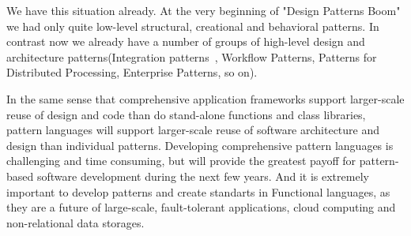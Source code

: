 We have this situation already. At the very beginning of "Design Patterns Boom" we had only quite low-level structural, creational and behavioral patterns. In contrast now we already have a number of groups of high-level design and architecture patterns(Integration patterns~\cite{res22}, Workflow Patterns, Patterns for Distributed Processing, Enterprise Patterns, so on). 

In the same sense that comprehensive application frameworks support larger-scale reuse of design and code than do stand-alone functions and class libraries, pattern languages will support larger-scale reuse of software architecture and design than individual patterns. Developing comprehensive pattern languages is challenging and time consuming, but will provide the greatest payoff for pattern-based software development during the next few years. And it is extremely important to develop patterns and create standarts in Functional languages, as they are a future of large-scale, fault-tolerant applications, cloud computing and non-relational data storages.


